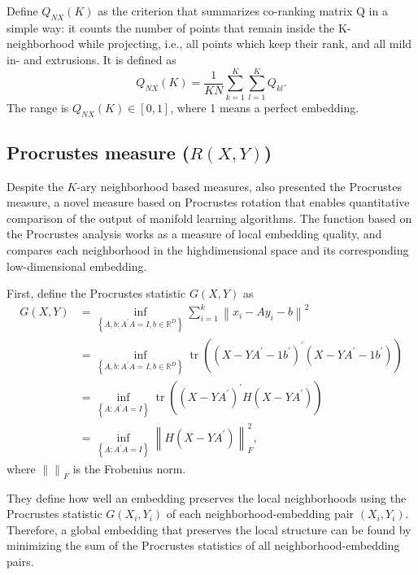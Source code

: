 \documentclass[11pt,a4paper,]{article}
\begin{document}
Define \(Q_{NX}(K)\) as the criterion that summarizes co-ranking matrix \(\mathrm{Q}\) in a simple way: it counts the number of points that remain inside the K-neighborhood while projecting, i.e., all points which keep their rank, and all mild in- and extrusions. It is defined as
\[
Q_{NX}(K)=\frac{1}{K N} \sum_{k=1}^{K} \sum_{l=1}^{K} Q_{k l}.
\]
The range is \(Q_{N X}(K) \in[0,1]\), where 1 means a perfect embedding.

\hypertarget{procrustes-measure-rxy}{%
\subsection{\texorpdfstring{Procrustes measure (\(R(X,Y)\))}{Procrustes measure (R(X,Y))}}\label{procrustes-measure-rxy}}

Despite the \(K\)-ary neighborhood based measures, \textcite{Goldberg2009-tb} also presented the Procrustes measure, a novel measure based on Procrustes rotation that enables quantitative comparison of the output of manifold learning algorithms. The function based on the Procrustes analysis works as a measure of local embedding quality, and compares each neighborhood in the highdimensional space and its corresponding low-dimensional embedding.

First, define the Procrustes statistic \(G(X, Y)\) as
\[
\begin{aligned}
G(X, Y) &= \inf _{\left\{A, b: A^{\prime} A=I, b \in \mathbb{R}^{D}\right\}} \sum_{i=1}^{k}\left\|x_{i}-A y_{i}-b\right\|^{2} \\
&= \inf _{\left\{A, b: A^{\prime} A=I, b \in \mathbb{R}^{D}\right\}} \operatorname{tr}\left(\left(X-Y A^{\prime}-1 b^{\prime}\right)^{\prime}\left(X-Y A^{\prime}-1 b^{\prime}\right)\right) \\
&= \inf _{\left\{A: A^{\prime} A=I\right\}} \operatorname{tr}\left(\left(X-Y A^{\prime}\right)^{\prime} H\left(X-Y A^{\prime}\right)\right) \\
&= \inf _{\left\{A: A^{\prime} A=I\right\}}\left\|H\left(X-Y A^{\prime}\right)\right\|_{F}^{2},
\end{aligned}
\]
where \(\left\| \right\|_{F}\) is the Frobenius norm.

They define how well an embedding preserves the local neighborhoods using the Procrustes statistic \(G(X_i,Y_i)\) of each neighborhood-embedding pair \((X_i,Y_i)\). Therefore, a global embedding that preserves
the local structure can be found by minimizing the sum of the Procrustes statistics of all neighborhood-embedding pairs.
\end{document}
